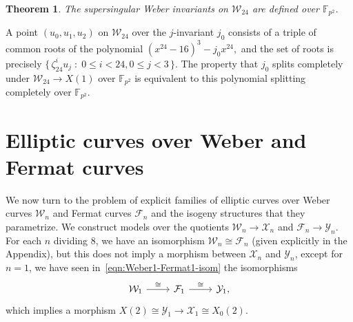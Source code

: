 \documentclass{amsart}
\newcommand{\cF}{\mathcal{F}}
\newcommand{\cX}{\mathcal{X}}
\newcommand{\cY}{\mathcal{Y}}
\newcommand{\cW}{\mathcal{W}}
\newcommand{\FF}{\mathbb{F}}
\newcommand{\isom}{\cong}
\newtheorem{theorem}{Theorem}
\begin{document}
\begin{theorem}
  \label{thm:weber_field}
  The supersingular Weber invariants on $\cW_{24}$ are defined over $\FF_{p^2}$.
\end{theorem}

 A point $(u_0,u_1,u_2)$ on $\cW_{24}$ over the $j$-invariant
$j_0$ consists of a triple of common roots of the polynomial
$
(x^{24}-16)^3 - j_0 x^{24},
$
and the set of roots is precisely $\{\, \zeta_{24}^i u_j \;:\; 0 \le i < 24, 0 \le j < 3\, \}$.
The property that $j_0$ splits completely under $\cW_{24} \to X(1)$ over $\FF_{p^2}$
is equivalent to this polynomial splitting completely over $\FF_{p^2}$.



\section*{Elliptic curves over Weber and Fermat curves}
\label{EllipticSurfaces}

We now turn to the problem of explicit families of elliptic curves over Weber curves
$\cW_n$ and Fermat curves $\cF_n$ and the isogeny structures that they parametrize.
We construct models over the quotients $\cW_n \longrightarrow \cX_n$ and
$\cF_n \longrightarrow \cY_n$.
For each $n$ dividing $8$, we have an isomorphism $\cW_n \isom \cF_n$ (given explicitly
in the Appendix), but this does not imply a morphism between $\cX_n$ and $\cY_n$,
except for $n = 1$, we have seen in~\eqref{eqn:Weber1-Fermat1-isom} the isomorphisms
$$
\begin{tikzcd}
  \cW_1 \arrow[r,"\isom"] & \cF_1 \arrow[r,"\isom"] & \cY_1,
\end{tikzcd}
$$
which implies a morphism $X(2) \isom \cY_1 \longrightarrow \cX_1 \isom X_0(2)$.
\end{document}
